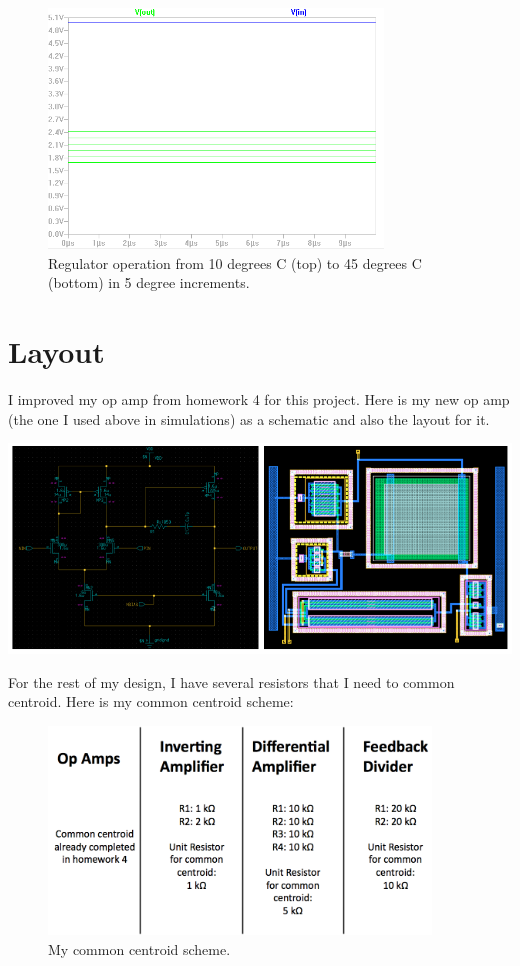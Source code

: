\documentclass[10pt]{amsart}
\begin{document}
\begin{figure}[h]
	\begin{center}
		\includegraphics[width=3.5in]{Media/thermsw.png}
	\end{center}
	\caption{Regulator operation from 10 degrees C (top) to 45 degrees C (bottom) in 5 degree increments.}
	\label{fig:neg}
\end{figure}

\section{Layout}

I improved my op amp from homework 4 for this project. Here is my new op amp (the one I used above in simulations) as a schematic and also the layout for it.
	\begin{center}
		\includegraphics[width=7in]{Media/opamp.png}
	\end{center}

For the rest of my design, I have several resistors that I need to common centroid. Here is my common centroid scheme:

\begin{figure}[h]
	\begin{center}
		\includegraphics[width=4in]{Media/ccplan.png}
	\end{center}
	\caption{My common centroid scheme.}
	\label{fig:cc}
\end{figure}
\end{document}
